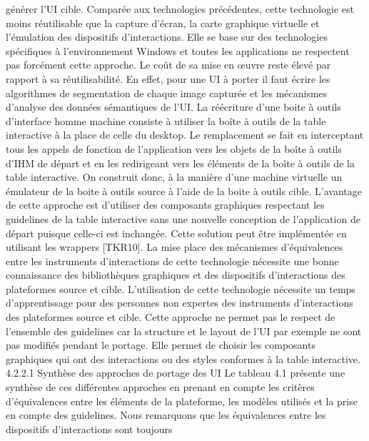 \documentclass{article}
\begin{document}
g\'{e}n\'{e}rer l’UI cible. Compar\'{e}e aux technologies pr\'{e}c\'{e}dentes, cette technologie est moins r\'{e}utilisable
que la capture d’\'{e}cran, la carte graphique virtuelle et l’\'{e}mulation des dispositifs d’interactions. Elle
se base sur des technologies sp\'{e}ciﬁques \`{a} l’environnement Windows et toutes les applications ne
respectent pas forc\'{e}ment cette approche. Le co\^{u}t de sa mise en œuvre reste \'{e}lev\'{e} par rapport \`{a} sa
r\'{e}utilisabilit\'{e}. En effet, pour une UI \`{a} porter il faut \'{e}crire les algorithmes de segmentation de chaque
image captur\'{e}e et les m\'{e}canismes d’analyse des donn\'{e}es s\'{e}mantiques de l’UI.
La r\'{e}\'{e}criture d’une boite \`{a} outils d’interface homme machine
consiste \`{a} utiliser la bo\^{i}te \`{a} outils
de la table interactive \`{a} la place de celle du desktop. Le remplacement se fait en interceptant tous les
appels de fonction de l’application vers les objets de la bo\^{i}te \`{a} outils d’IHM de d\'{e}part et en les redirigeant vers les \'{e}l\'{e}ments de la bo\^{i}te \`{a} outils de la table interactive. On construit donc, \`{a} la mani\`{e}re d’une
machine virtuelle un \'{e}mulateur de la boite \`{a} outils source \`{a} l’aide de la boite \`{a} outils cible. L’avantage
de cette approche est d’utiliser des composants graphiques respectant les guidelines de la table interactive sans une nouvelle conception de l’application de d\'{e}part puisque celle-ci est inchang\'{e}e. Cette
solution peut \^{e}tre impl\'{e}ment\'{e}e en utilisant les wrappers [TKR10]. La mise place des m\'{e}canismes
d’\'{e}quivalences entre les instruments d’interactions de cette technologie n\'{e}cessite une bonne connaissance des biblioth\`{e}ques graphiques et des dispositifs d’interactions des plateformes source et cible.
L’utilisation de cette technologie n\'{e}cessite un temps d’apprentissage pour des personnes non expertes
des instruments d’interactions des plateformes source et cible. Cette approche ne permet pas le respect de l’ensemble des guidelines car la structure et le layout de l’UI par exemple ne sont pas modiﬁ\'{e}s
pendant le portage. Elle permet de choisir les composants graphiques qui ont des interactions ou des
styles conformes \`{a} la table interactive.
4.2.2.1
Synth\`{e}se des approches de portage des UI
Le tableau 4.1 pr\'{e}sente une synth\`{e}se de ces diff\'{e}rentes approches en prenant en compte les crit\`{e}res d’\'{e}quivalences entre les \'{e}l\'{e}ments de la plateforme, les mod\`{e}les utilis\'{e}s et la prise en compte des
guidelines. Nous remarquons que les \'{e}quivalences entre les dispositifs d’interactions sont toujours
\end{document}
